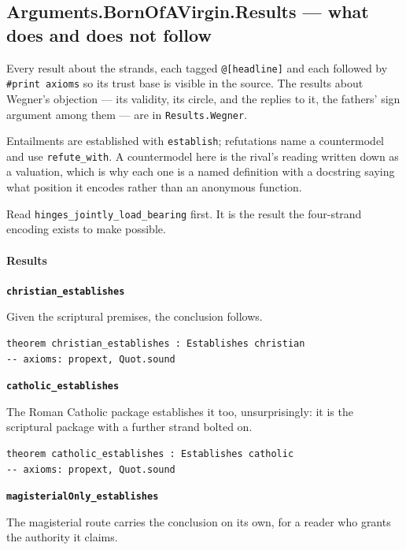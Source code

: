 \documentclass[11pt]{article}
\begin{document}
\subsection*{Arguments.BornOfAVirgin.Results — what does and does not follow}
Every result about the strands, each tagged \texttt{@[headline]} and each followed by \texttt{\#print axioms} so its trust base is visible in the source. The results about Wegner's objection — its validity, its circle, and the replies to it, the fathers' sign argument among them — are in \texttt{Results.Wegner}.

Entailments are established with \texttt{establish}; refutations name a countermodel and use \texttt{refute\_\allowbreak{}with}. A countermodel here is the rival's reading written down as a valuation, which is why each one is a named definition with a docstring saying what position it encodes rather than an anonymous function.

Read \texttt{hinges\_\allowbreak{}jointly\_\allowbreak{}load\_\allowbreak{}bearing} first. It is the result the four-strand encoding exists to make possible.

\paragraph*{Results}
\leavevmode\par
\par\medskip\noindent\textbf{\texttt{christian\_\allowbreak{}establishes}}\par\nobreak\noindent
Given the scriptural premises, the conclusion follows.

{\small\begin{verbatim}
theorem christian_establishes : Establishes christian
-- axioms: propext, Quot.sound
\end{verbatim}}
\par\medskip\noindent\textbf{\texttt{catholic\_\allowbreak{}establishes}}\par\nobreak\noindent
The Roman Catholic package establishes it too, unsurprisingly: it is the scriptural package with a further strand bolted on.

{\small\begin{verbatim}
theorem catholic_establishes : Establishes catholic
-- axioms: propext, Quot.sound
\end{verbatim}}
\par\medskip\noindent\textbf{\texttt{magisterial\allowbreak{}Only\_\allowbreak{}establishes}}\par\nobreak\noindent
The magisterial route carries the conclusion on its own, for a reader who grants the authority it claims.
\end{document}
